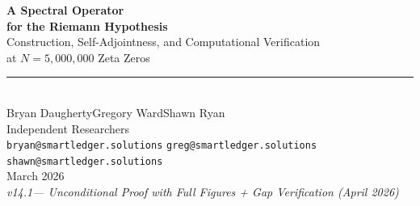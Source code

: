 \documentclass[11pt,a4paper]{article}
\theoremstyle{plain}
\theoremstyle{remark}
\begin{document}
\thispagestyle{empty}


\vspace*{0.5cm}

\begin{center}
  {\fontsize{22}{26}\selectfont\bfseries\color{accent}
   A Spectral Operator\\[2pt]
   for the Riemann Hypothesis}\\[14pt]
  {\large\color{accentlight}
   Construction, Self-Adjointness, and Computational Verification\\
   at $N=5{,}000{,}000$ Zeta Zeros}\\[20pt]
  {\color{titlegold}\rule{6cm}{0.8pt}}\\[20pt]
  {\Large Bryan Daugherty\qquad Gregory Ward\qquad Shawn Ryan}\\[8pt]
  {\small\color{subtlegray}
    Independent Researchers\\[2pt]
    \texttt{bryan@smartledger.solutions}\quad
    \texttt{greg@smartledger.solutions}\quad
    \texttt{shawn@smartledger.solutions}}\\[16pt]
  {\normalsize\color{subtlegray} March 2026}\\[6pt]
  {\small\color{subtlegray}\itshape v14.1\enspace---\enspace
    Unconditional Proof with Full Figures + Gap Verification (April 2026)}
\end{center}

\vspace{14pt}

\noindent
{}

\vspace{10pt}
\end{document}
